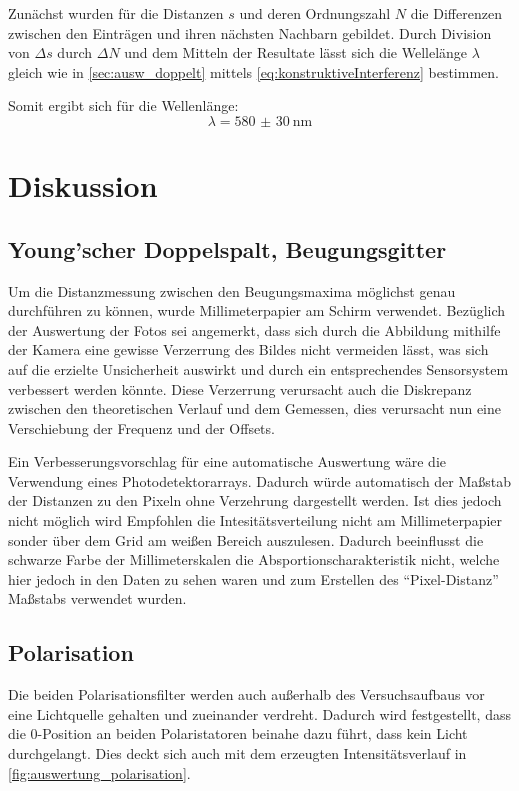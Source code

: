 \documentclass[12pt,english,ngerman]{scrartcl}
\begin{document}
Zunächst wurden für die Distanzen $s$ und deren Ordnungszahl $N$ die Differenzen 
zwischen den Einträgen und ihren nächsten Nachbarn gebildet. Durch
Division von $\Delta s$ durch $\Delta N$ und dem Mitteln der Resultate lässt sich
die Wellelänge $\lambda$ gleich wie in \autoref{sec:ausw_doppelt} mittels
\autoref{eq:konstruktiveInterferenz} bestimmen.

Somit ergibt sich für die Wellenlänge:
\begin{equation*}
	\lambda = \SI{580(30)}{\nm}
\end{equation*}

\section{Diskussion}\label{sec:diskussion}


\subsection{Young'scher Doppelspalt, Beugungsgitter}

Um die Distanzmessung zwischen den Beugungsmaxima möglichst genau durchführen
zu können, wurde Millimeterpapier am Schirm verwendet. Bezüglich der Auswertung
der Fotos sei angemerkt, dass sich durch die Abbildung mithilfe der Kamera eine
gewisse Verzerrung des Bildes nicht vermeiden lässt, was sich auf die erzielte
Unsicherheit auswirkt und durch ein entsprechendes Sensorsystem verbessert
werden könnte. Diese Verzerrung verursacht auch die Diskrepanz zwischen den
theoretischen Verlauf und dem Gemessen, dies verursacht nun eine Verschiebung
der Frequenz und der Offsets.

Ein Verbesserungsvorschlag für eine automatische Auswertung wäre die Verwendung eines Photodetektorarrays. 
Dadurch würde automatisch der Maßstab der Distanzen zu den Pixeln ohne Verzehrung dargestellt werden. Ist dies jedoch
nicht möglich wird Empfohlen die Intesitätsverteilung nicht am Millimeterpapier sonder über dem 
Grid am weißen Bereich auszulesen. Dadurch beeinflusst die schwarze Farbe der Millimeterskalen
die Absportionscharakteristik nicht, welche hier jedoch in den Daten zu sehen waren und zum
Erstellen des ``Pixel-Distanz'' Maßstabs verwendet wurden.

\subsection{Polarisation}

Die beiden Polarisationsfilter werden auch außerhalb des Versuchsaufbaus vor
eine Lichtquelle gehalten und zueinander verdreht. Dadurch wird festgestellt,
dass die 0-Position an beiden Polaristatoren beinahe dazu führt, dass kein
Licht durchgelangt. Dies deckt sich auch mit dem erzeugten Intensitätsverlauf
in \autoref{fig:auswertung_polarisation}.
\end{document}
